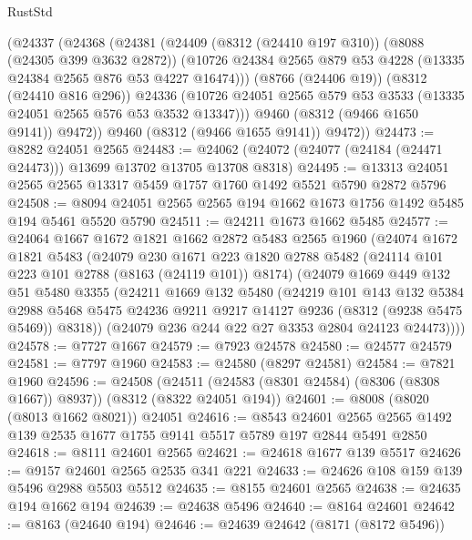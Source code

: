 \begin{lexlean}{RustStd}
\begin{coremodule}
        (@24337
          (@24368
            (@24381
              (@24409
                (@8312 (@24410 @197 @310))
                (@8088 (@24305 @399 @3632 @2872))
                (@10726 @24384 @2565 @879 @53 @4228 (@13335 @24384 @2565 @876 @53 @4227 @16474)))
              (@8766 (@24406 @19))
              (@8312 (@24410 @816 @296))
              @24336
              (@10726 @24051 @2565 @579 @53 @3533 (@13335 @24051 @2565 @576 @53 @3532 @13347)))
            @9460
            (@8312 (@9466 @1650 @9141))
            @9472))
        @9460
        (@8312 (@9466 @1655 @9141))
        @9472))
@24473 := @8282 @24051 @2565
@24483 := @24062 (@24072 (@24077 (@24184 (@24471 @24473))) @13699 @13702 @13705 @13708 @8318)
@24495 := @13313 @24051 @2565 @2565 @13317 @5459 @1757 @1760 @1492 @5521 @5790 @2872 @5796
@24508 := @8094 @24051 @2565 @2565 @194 @1662 @1673 @1756 @1492 @5485 @194 @5461 @5520 @5790
@24511 := @24211 @1673 @1662 @5485
@24577 := @24064
    @1667
    @1672
    @1821
    @1662
    @2872
    @5483
    @2565
    @1960
    (@24074
      @1672
      @1821
      @5483
      (@24079
        @230
        @1671
        @223
        @1820
        @2788
        @5482
        (@24114 @101 @223 @101 @2788 (@8163 (@24119 @101)) @8174)
        (@24079
          @1669
          @449
          @132
          @51
          @5480
          @3355
          (@24211
            @1669
            @132
            @5480
            (@24219
              @101
              @143
              @132
              @5384
              @2988
              @5468
              @5475
              @24236
              @9211
              @9217
              @14127
              @9236
              (@8312 (@9238 @5475 @5469))
              @8318))
          (@24079 @236 @244 @22 @27 @3353 @2804 @24123 @24473))))
@24578 := @7727 @1667
@24579 := @7923 @24578
@24580 := @24577 @24579
@24581 := @7797 @1960
@24583 := @24580 (@8297 @24581)
@24584 := @7821 @1960
@24596 := @24508
    (@24511 (@24583 (@8301 @24584) (@8306 (@8308 @1667)) @8937))
    (@8312 (@8322 @24051 @194))
@24601 := @8008 (@8020 (@8013 @1662 @8021)) @24051
@24616 := @8543
    @24601
    @2565
    @2565
    @1492
    @139
    @2535
    @1677
    @1755
    @9141
    @5517
    @5789
    @197
    @2844
    @5491
    @2850
@24618 := @8111 @24601 @2565
@24621 := @24618 @1677 @139 @5517
@24626 := @9157 @24601 @2565 @2535 @341 @221
@24633 := @24626 @108 @159 @139 @5496 @2988 @5503 @5512
@24635 := @8155 @24601 @2565
@24638 := @24635 @194 @1662 @194
@24639 := @24638 @5496
@24640 := @8164 @24601
@24642 := @8163 (@24640 @194)
@24646 := @24639 @24642 (@8171 (@8172 @5496))

\end{coremodule}
\end{lexlean}
